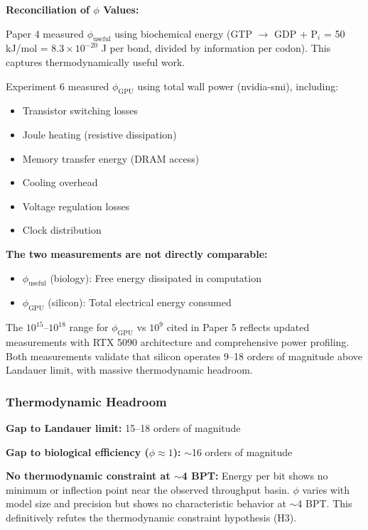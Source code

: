 \documentclass[11pt,a4paper]{article}
\begin{document}
\textbf{Reconciliation of $\phi$ Values:}

Paper 4 measured $\phi_{\text{useful}}$ using biochemical energy (GTP $\rightarrow$ GDP + P$_i$ = 50 kJ/mol = $8.3 \times 10^{-20}$ J per bond, divided by information per codon). This captures thermodynamically useful work.

Experiment 6 measured $\phi_{\text{GPU}}$ using total wall power (nvidia-smi), including:
\begin{itemize}
\item Transistor switching losses
\item Joule heating (resistive dissipation)
\item Memory transfer energy (DRAM access)
\item Cooling overhead
\item Voltage regulation losses
\item Clock distribution
\end{itemize}

\textbf{The two measurements are not directly comparable:}
\begin{itemize}
\item $\phi_{\text{useful}}$ (biology): Free energy dissipated in computation
\item $\phi_{\text{GPU}}$ (silicon): Total electrical energy consumed
\end{itemize}

The $10^{15}$--$10^{18}$ range for $\phi_{\text{GPU}}$ vs $10^9$ cited in Paper 5 reflects updated measurements with RTX 5090 architecture and comprehensive power profiling. Both measurements validate that silicon operates 9--18 orders of magnitude above Landauer limit, with massive thermodynamic headroom.

\subsubsection{Thermodynamic Headroom}

\textbf{Gap to Landauer limit:} 15--18 orders of magnitude

\textbf{Gap to biological efficiency ($\phi \approx 1$):} $\sim$16 orders of magnitude

\textbf{No thermodynamic constraint at $\sim$4 BPT:} Energy per bit shows no minimum or inflection point near the observed throughput basin. $\phi$ varies with model size and precision but shows no characteristic behavior at $\sim$4 BPT. This definitively refutes the thermodynamic constraint hypothesis (H3).
\end{document}
